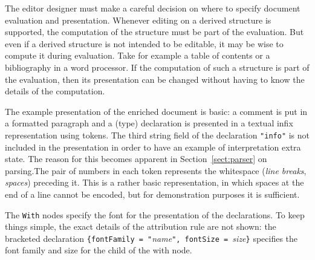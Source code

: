 The editor designer must make a careful decision on where to specify document evaluation and presentation. Whenever editing on a derived structure is supported, the computation of the structure must be part of the evaluation. But even if a derived structure is not intended to be editable, it may be wise to compute it during evaluation. Take for example a table of contents or a bibliography in a word processor. If the computation of such a structure is part of the evaluation, then its presentation can be changed without having to know the details of the computation.

 The example presentation of the enriched document is basic: a comment is put in a formatted paragraph and a (type) declaration is presented in a textual infix representation using tokens. The third string field of the declaration \verb|"info"| is not included in the presentation in order to have an example of interpretation extra state. \bc The reason for this becomes apparent in Section~\ref{sect:parser} on parsing.\ec  The pair of numbers in each token represents the whitespace ({\em line breaks}, {\em spaces}) preceding it. This is a rather basic representation, in which spaces at the end of a line cannot be encoded, but for demonstration purposes it is sufficient.

The \verb|With| nodes specify the font for the presentation of the declarations. To keep things simple, the exact details of the attribution rule are not shown: the bracketed declaration \verb|{fontFamily = "|{\em name}\verb|", fontSize = |{\em size}\verb|}| specifies the font family and size for the child of the with node.

